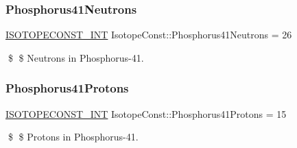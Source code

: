 \subsubsection{\texorpdfstring{Phosphorus41\+Neutrons}{Phosphorus41Neutrons}}
{\footnotesize\ttfamily \mbox{\hyperlink{group___isotope_const-_macros_ga5f18360b3e99483a35c32d789e62621c}{I\+S\+O\+T\+O\+P\+E\+C\+O\+N\+S\+T\+\_\+\+I\+NT}} Isotope\+Const\+::\+Phosphorus41\+Neutrons = 26}

\$ \$ Neutrons in Phosphorus-\/41. \mbox{\label{group___isotope_const-_phosphorus-_p41_ga430434d0ead0741b56f403a51beacf0a}} 
\subsubsection{\texorpdfstring{Phosphorus41\+Protons}{Phosphorus41Protons}}
{\footnotesize\ttfamily \mbox{\hyperlink{group___isotope_const-_macros_ga5f18360b3e99483a35c32d789e62621c}{I\+S\+O\+T\+O\+P\+E\+C\+O\+N\+S\+T\+\_\+\+I\+NT}} Isotope\+Const\+::\+Phosphorus41\+Protons = 15}

\$ \$ Protons in Phosphorus-\/41. 